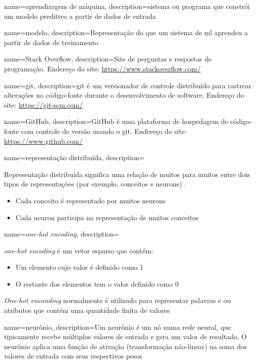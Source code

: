 {
    name=aprendizagem de máquina,
    description={sistema ou programa que constrói um modelo preditivo a partir de dados de entrada \citep{glossary-ml}}
}

{
    name=modelo,
    description={Representação do que um sistema de \gls{ml} aprendeu a partir de dados de treinamento \citep{glossary-ml}}
}

{
    name=Stack Overflow,
    description={Site de perguntas e respostas de programação. Endereço do site: \url{https://www.stackoverflow.com/}}
}

{
    name=git,
    description={git é um versionador de controle distribuído para rastrear alterações no código-fonte durante o desenvolvimento de software. Endereço do site: \url{https://git-scm.com/} \citep{wikipedia-git-2019}}
}

{
    name=GitHub,
    description={GitHub é uma plataforma de hospedagem de código-fonte com controle de versão usando o \gls{git}. Endereço do site: \url{https://www.github.com/}}
}

{
    name=representação distribuída,
    description={Representação distribuída significa uma relação de muitos para muitos entre dois tipos de representações (por exemplo, conceitos e \gls{neuron}s) \citep{Hinton-distributed-representatons:1986}. 
    \begin{itemize}
        \item Cada conceito é representado por muitos \gls{neuron}s
        \item Cada \gls{neuron} participa na representação de muitos conceitos
    \end{itemize}
    }
}

{
    name=\textit{one-hot encoding},
    description={\textit{one-hot encoding} é um vetor esparso que contém:
    \begin{itemize}
        \item Um elemento cujo valor é definido como 1
        \item O restante dos elementos tem o valor definido como 0
    \end{itemize}
    \textit{One-hot enconding} normalmente é utilizado para representar palavras e ou atributos que contém uma quantidade finita de valores \citep{glossary-ml}
    }
}

{
    name=neurônio,
    description={Um neurônio é um nó numa rede neural, que tipicamente recebe múltiplos valores de entrada e gera um valor de resultado. O neurônio aplica uma função de ativação (transformação não-linear) na soma dos valores de entrada com seus respectivos pesos \citep{glossary-ml}}
}

